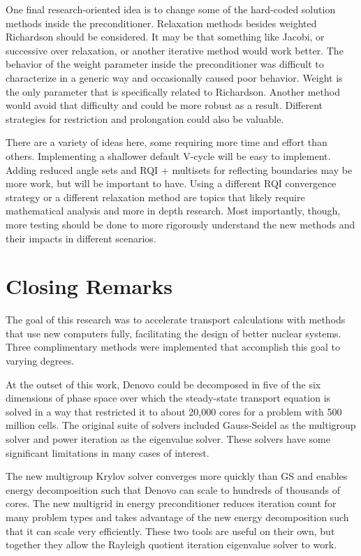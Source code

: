 One final research-oriented idea is to change some of the hard-coded solution methods inside the preconditioner. Relaxation methods besides weighted Richardson should be considered. It may be that something like Jacobi, or successive over relaxation, or another iterative method would work better. The behavior of the weight parameter inside the preconditioner was difficult to characterize in a generic way and occasionally caused poor behavior. Weight is the only parameter that is specifically related to Richardson. Another method would avoid that difficulty and could be more robust as a result. Different strategies for restriction and prolongation could also be valuable. 

There are a variety of ideas here, some requiring more time and effort than others. Implementing a shallower default V-cycle will be easy to implement. Adding reduced angle sets and RQI + multisets for reflecting boundaries may be more work, but will be important to have. Using a different RQI convergence strategy or a different relaxation method are topics that likely require mathematical analysis and more in depth research. Most importantly, though, more testing should be done to more rigorously understand the new methods and their impacts in different scenarios.  

\section{Closing Remarks}
The goal of this research was to accelerate transport calculations with methods that use new computers fully, facilitating the design of better nuclear systems. Three complimentary methods were implemented that accomplish this goal to varying degrees. 

At the outset of this work, Denovo could be decomposed in five of the six dimensions of phase space over which the steady-state transport equation is solved in a way that restricted it to about 20,000 cores for a problem with 500 million cells. The original suite of solvers included Gauss-Seidel as the multigroup solver and power iteration as the eigenvalue solver. These solvers have some significant limitations in many cases of interest. 

The new multigroup Krylov solver converges more quickly than GS and enables energy decomposition such that Denovo can scale to hundreds of thousands of cores. The new multigrid in energy preconditioner reduces iteration count for many problem types and takes advantage of the new energy decomposition such that it can scale very efficiently. These two tools are useful on their own, but together they allow the Rayleigh quotient iteration eigenvalue solver to work.

